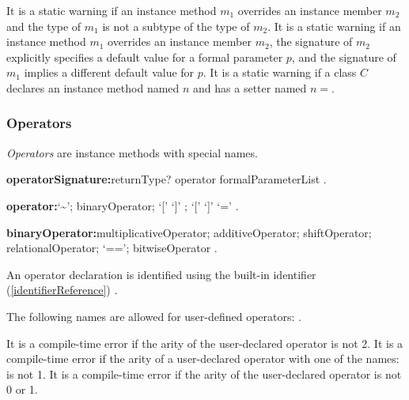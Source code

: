 \documentclass{article}
\begin{document}

\LMHash{}
It is a static warning if an instance method $m_1$ overrides an instance member $m_2$ and the type of $m_1$ is not a subtype of the type of $m_2$.
It is a static warning if an instance method $m_1$ overrides an instance member $m_2$, the signature of $m_2$ explicitly specifies a default value for a formal parameter $p$, and the signature of $m_1$ implies a different default value for $p$.
It is a static warning if a class $C$ declares an instance method named $n$ and has a setter named $n=$.



\subsubsection{Operators}

\LMHash{}
{\em Operators} are instance methods with special names.

\begin{grammar}
{\bf operatorSignature:}returnType? \OPERATOR{} operator formalParameterList
  .

{\bf operator:}`\~{}';
  binaryOperator;
  `[' `]' ;
  `[' `]' `='
  .

{\bf binaryOperator:}multiplicativeOperator;
  additiveOperator;
  shiftOperator;
  relationalOperator;
  `==';
  bitwiseOperator
  .
\end{grammar}

\LMHash{}
An operator declaration is identified using the built-in identifier (\ref{identifierReference}) \OPERATOR{}.

\LMHash{}
The following names are allowed for user-defined operators: \code{<, >, <=, >=, ==, -, +, /, \~{}/, *, \%, $|$, \^{}, \&, $<<$, $>>$, $>>>$, []=, [], \~{}}.

\LMHash{}
It is a compile-time error if the arity of the user-declared operator \code{[]=} is not 2.
It is a compile-time error if the arity of a user-declared operator with one of the names: \code{<, >, <=, >=, ==, -, +, \~{}/, /, *, \%, $|$, \^{}, \&, $<<$, $>>$, $>>>$, []} is not 1.
It is a compile-time error if the arity of the user-declared operator \code{-} is not 0 or 1.
\end{document}
